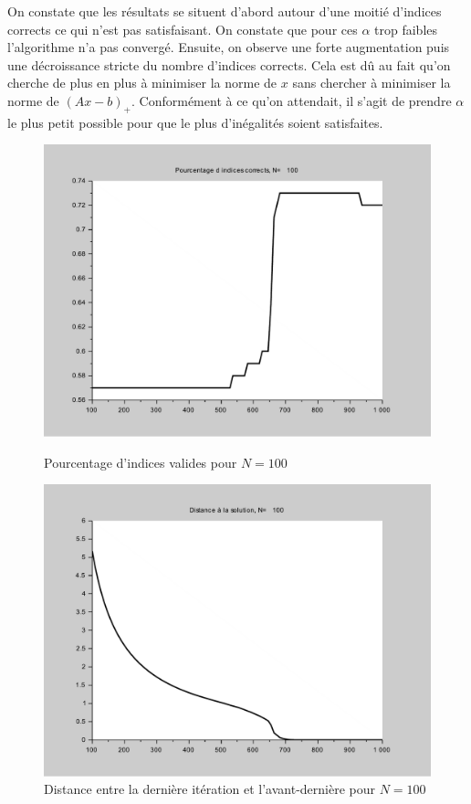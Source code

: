 \documentclass[10pt,a4paper]{article}
\begin{document}
On constate que les résultats se situent d'abord autour d'une moitié d'indices corrects ce qui n'est pas satisfaisant.
On constate que pour ces $\alpha$ trop faibles l'algorithme n'a pas convergé.
Ensuite, on observe une forte augmentation puis une décroissance stricte du nombre d'indices corrects.
Cela est dû au fait qu'on cherche de plus en plus à minimiser la norme de $x$ sans chercher à minimiser la norme de $(Ax-b)_+$.
Conformément à ce qu'on attendait, il s'agit de prendre $\alpha$ le plus petit possible pour que le plus d'inégalités soient satisfaites.
\begin{figure}[H]
\centering
\begin{minipage}[b]{.46\linewidth}
\centering
\includegraphics[scale=0.3]{percent_alpha1_100.pdf}
\caption{Pourcentage d'indices valides pour $N=100$}
\end{minipage}
\begin{minipage}[b]{.46\linewidth}
\centering
\includegraphics[scale=0.3]{dist_alpha1_100.pdf}
\caption{Distance entre la dernière itération et l'avant-dernière pour $N=100$}
\end{minipage}
\end{figure}
\end{document}
